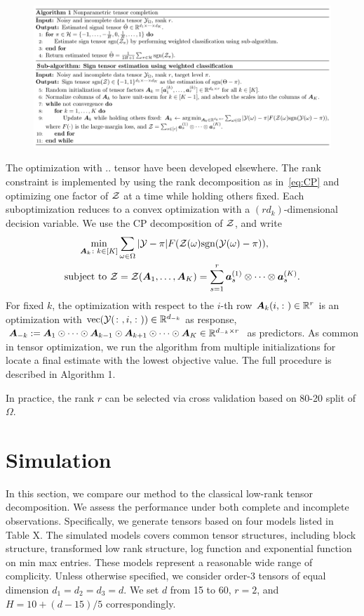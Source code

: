 \documentclass{article}
\theoremstyle{plain}
\theoremstyle{definition}
\def\sign{\textup{sgn}}
\begin{document}
\begin{figure}[h]
\includegraphics[width=\textwidth]{figure/algorithm.pdf}
\end{figure}


The optimization with .. tensor have been developed elsewhere. The rank constraint is implemented by using the rank decomposition as in~\eqref{eq:CP} and optimizing one factor of $\mathcal{Z}$ at a time while holding others fixed. Each suboptimization reduces to a convex optimization with a $(rd_k)$-dimensional decision variable. 
We use the CP decomposition of $\mathcal{Z}$, and write 
\begin{align}
\min_{\mA_k\colon k\in[K]}&\sum_{\omega\in \Omega}|\tY-\pi|F(\tZ(\omega)\sign(\tY(\omega)-\pi)),\\
\text{subject to }\tZ&=\tZ(\mA_1,\ldots,\mA_K)=\sum_{s=1}^r\ma^{(1)}_s\otimes \cdots \otimes \ma^{(K)}_s.
\end{align}
For fixed $k$, the optimization with respect to the $i$-th row $\bm A_k(i,\colon)\in\mathbb{R}^{r}$ is an optimization with $\text{vec}(\mathcal{Y}(\colon,i,\colon))\in\mathbb{R}^{d_{-k}}$ as response, $\bm A_{-k}:=\bm A_1\odot \cdots \odot \bm A_{k-1}\odot \bm A_{k+1}\odot \cdots \odot \bm A_K \in\mathbb{R}^{d_{-k}\times r}$ as predictors. 
As common in tensor optimization, we run the algorithm from multiple initializations for locate a final estimate with the lowest objective value. The full procedure is described in Algorithm 1.

In practice, the rank $r$ can be selected via cross validation based on 80-20 split of $\Omega$.

\section{Simulation}
In this section, we compare our method to the classical low-rank tensor decomposition. We assess the performance under both complete and incomplete observations. Specifically, we generate tensors based on four models listed in Table X. The simulated models covers common tensor structures, including block structure, transformed low rank structure, log function and exponential function on min max entries. These models represent a reasonable wide range of complicity. Unless otherwise specified, we consider order-3  tensors of equal dimension $d_1=d_2=d_3=d$. We set $d$ from 15 to 60, $r=2$, and $H=10+(d-15)/5$ correspondingly.
\end{document}
